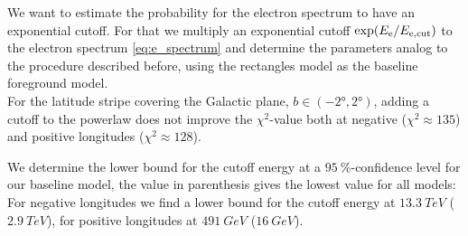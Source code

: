 We want to estimate the probability for the electron spectrum to have an exponential cutoff. For that we multiply an exponential cutoff $\exp(E_{\text{e}} / E_{\text{e},\text{cut}})$ to the electron spectrum \eqref{eq:e_spectrum} and determine the parameters analog to the procedure described before, using the rectangles model as the baseline foreground model.\\
For the latitude stripe covering the Galactic plane, $b \in (-\ang{2}, \ang{2})$, adding a cutoff to the powerlaw does not improve the $\chi^2$-value both at negative ($\chi^2 \approx 135$) and positive longitudes ($\chi^2 \approx 128$).

We determine the lower bound for the cutoff energy at a $\SI{95}{\percent}$-confidence level for our baseline model, the value in parenthesis gives the lowest value for all models: For negative longitudes we find a lower bound for the cutoff energy at $\SI{13.3}{TeV}$ ($\SI{2.9}{TeV}$), for positive longitudes at $\SI{491}{GeV}$ ($\SI{16}{GeV}$).

